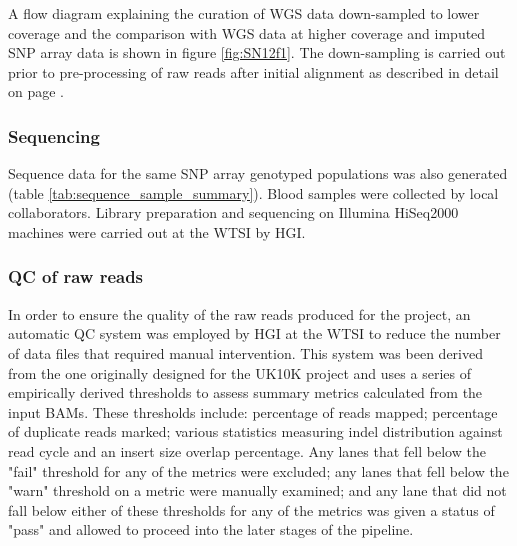 A flow diagram explaining the curation of \gls{WGS} data down-sampled to lower coverage and the comparison with \gls{WGS} data at higher coverage and imputed SNP array data is shown in figure \ref{fig:SN12f1}. The down-sampling is carried out prior to pre-processing of raw reads after initial alignment as described in detail on page \pageref{subsubsec:downsampling}.


\subsubsection{Sequencing}
\label{subsec:sequence}
Sequence data for the same SNP array genotyped populations was also generated (table \ref{tab:sequence_sample_summary}). Blood samples were collected by local collaborators. Library preparation and sequencing on Illumina HiSeq2000 machines were carried out at the \gls{WTSI} by \gls{HGI}.



\subsubsection{QC of raw reads}
In order to ensure the quality of the raw reads produced for the project, an automatic \gls{QC} system was employed by \gls{HGI} at the \gls{WTSI} to reduce the number of data files that required manual intervention. This system was been derived from the one originally designed for the UK10K project and uses a series of empirically derived thresholds to assess summary metrics calculated from the input \glspl{BAM}. These thresholds include: percentage of reads mapped; percentage of duplicate reads marked; various statistics measuring indel distribution against read cycle and an insert size overlap percentage. Any lanes that fell below the "fail" threshold for any of the metrics were excluded; any lanes that fell below the "warn" threshold on a metric were manually examined; and any lane that did not fall below either of these thresholds for any of the metrics was given a status of "pass" and allowed to proceed into the later stages of the pipeline.

